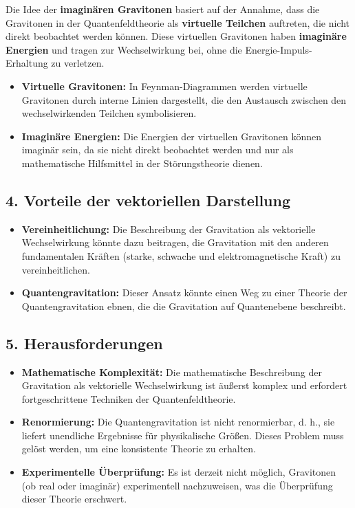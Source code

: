 \documentclass{article}
\begin{document}
Die Idee der \textbf{imaginären Gravitonen} basiert auf der Annahme, dass die Gravitonen in der Quantenfeldtheorie als \textbf{virtuelle Teilchen} auftreten, die nicht direkt beobachtet werden können. Diese virtuellen Gravitonen haben \textbf{imaginäre Energien} und tragen zur Wechselwirkung bei, ohne die Energie-Impuls-Erhaltung zu verletzen.

\begin{itemize}
	\item \textbf{Virtuelle Gravitonen:} In Feynman-Diagrammen werden virtuelle Gravitonen durch interne Linien dargestellt, die den Austausch zwischen den wechselwirkenden Teilchen symbolisieren.
	\item \textbf{Imaginäre Energien:} Die Energien der virtuellen Gravitonen können imaginär sein, da sie nicht direkt beobachtet werden und nur als mathematische Hilfsmittel in der Störungstheorie dienen.
\end{itemize}

\subsection{4. Vorteile der vektoriellen Darstellung}

\begin{itemize}
	\item \textbf{Vereinheitlichung:} Die Beschreibung der Gravitation als vektorielle Wechselwirkung könnte dazu beitragen, die Gravitation mit den anderen fundamentalen Kräften (starke, schwache und elektromagnetische Kraft) zu vereinheitlichen.
	\item \textbf{Quantengravitation:} Dieser Ansatz könnte einen Weg zu einer Theorie der Quantengravitation ebnen, die die Gravitation auf Quantenebene beschreibt.
\end{itemize}

\subsection{5. Herausforderungen}

\begin{itemize}
	\item \textbf{Mathematische Komplexität:} Die mathematische Beschreibung der Gravitation als vektorielle Wechselwirkung ist äußerst komplex und erfordert fortgeschrittene Techniken der Quantenfeldtheorie.
	\item \textbf{Renormierung:} Die Quantengravitation ist nicht renormierbar, d. h., sie liefert unendliche Ergebnisse für physikalische Größen. Dieses Problem muss gelöst werden, um eine konsistente Theorie zu erhalten.
	\item \textbf{Experimentelle Überprüfung:} Es ist derzeit nicht möglich, Gravitonen (ob real oder imaginär) experimentell nachzuweisen, was die Überprüfung dieser Theorie erschwert.
\end{itemize}
\end{document}
